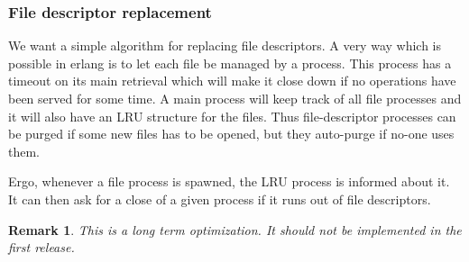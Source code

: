 \documentclass[a4paper]{memoir}
\newtheorem{remark}{Remark}
\begin{document}
\subsubsection{File descriptor replacement}
We want a simple algorithm for replacing file descriptors. A very way
which is possible in erlang is to let each file be managed by a
process. This process has a timeout on its main retrieval which will
make it close down if no operations have been served for some time. A
main process will keep track of all file processes and it will also
have an LRU structure for the files. Thus file-descriptor processes can be
purged if some new files has to be opened, but they auto-purge if
no-one uses them.

Ergo, whenever a file process is spawned, the LRU process is informed
about it. It can then ask for a close of a given process if it runs
out of file descriptors.
\begin{remark}
  This is a long term optimization. It should not be implemented in
  the first release.
\end{remark}
\end{document}

